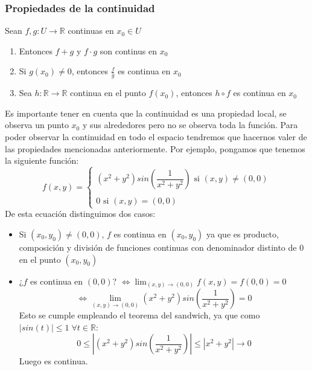 \documentclass[11pt]{article}
\providecommand{\abs}[1]{\left\lvert #1\right\rvert}
\providecommand{\abs}[1]{\left\lvert #1\right\rvert}
\newcommand{\R}{\mathbb{R}}
\theoremstyle{plain}
\begin{document}
            \subsubsection{Propiedades de la continuidad} %
            \label{subsub:propiedades_de_la_continuidad}
                Sean $f,g: U \rightarrow \R$ continuas en $x_0 \in U$
                \begin{enumerate}[label = \Alph*]
                    \item Entonces $f+g$ y $f \cdot g$ son continus en $x_0$
                    \item Si $g(x_0) \ne 0$, entonces $\frac {f}{g}$ es continua en $x_0$
                    \item Sea $h:\R\rightarrow\R$ continua en el punto $f(x_0)$, entonces $h \circ f$ es continua en $x_0$
                \end{enumerate}
                Es importante tener en cuenta que la continuidad es una propiedad local, se observa un punto $x_0$ y sus alrededores pero no se observa toda la función. Para poder observar la continuidad en todo el espacio tendremos que hacernos valer de las propiedades mencionadas anteriormente. Por ejemplo, pongamos que tenemos la siguiente función:
                \begin{equation}
                    f(x,y) = 
                    \begin{cases}
                        (x^2 + y^2)sin(\dfrac{1}{x^2+y^2}) \text{ si } (x,y)\ne(0,0)\\ \\ 0 \text{ si } (x,y) = (0,0)
                    \end{cases}
                \end{equation}
                De esta ecuación distinguimos dos casos:
                \begin{itemize}
                    \item Si $(x_0,y_0) \ne (0,0)$, $f$ es continua en $(x_0,y_0)$ ya que es producto, composición y división de funciones continuas con denominador distinto de 0 en el punto $(x_0,y_0)$
                    \item ¿$f$ es continua en $(0,0)$? $\Leftrightarrow \lim_{(x,y)\to(0,0)} f(x,y) = f(0,0) = 0$
                    \[\Leftrightarrow \lim_{(x,y)\to(0,0)} (x^2 + y^2)sin(\frac{1}{x^2 + y^2}) = 0 \]
                    Esto se cumple empleando el teorema del sandwich, ya que como $\abs{sin(t)} \le 1 \; \forall t\in\R$:
                    \[0 \le \abs{(x^2+y^2)sin(\frac{1}{x^2+y^2})}\le \abs{x^2 + y^2} \rightarrow 0\]
                    Luego es continua.
                \end{itemize}
\end{document}
